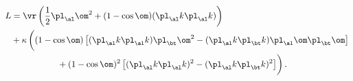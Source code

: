\begin{equation}                                        \label{elaomn}
\begin{split}
  L&=\vr\left(\frac12\pl_\al\om^2+(1-\cos\om)(\pl_\al k\pl_\al k)\right)
\\
  &+\kappa\left(\vphantom{\frac12}(1-\cos\om)
  \left[(\pl_\al k\pl_\al k)\pl_\bt\om^2
  -(\pl_\al k\pl_\bt k)\pl_\al\om\pl_\bt\om\right]\right.
\\
  &\left.\vphantom{\frac12}~~~~~~~~~~~~~~~
  +(1-\cos\om)^2\left[(\pl_\al k\pl_\al k)^2
  -(\pl_\al k\pl_\bt k)^2\right]\right).
\end{split}
\end{equation}

